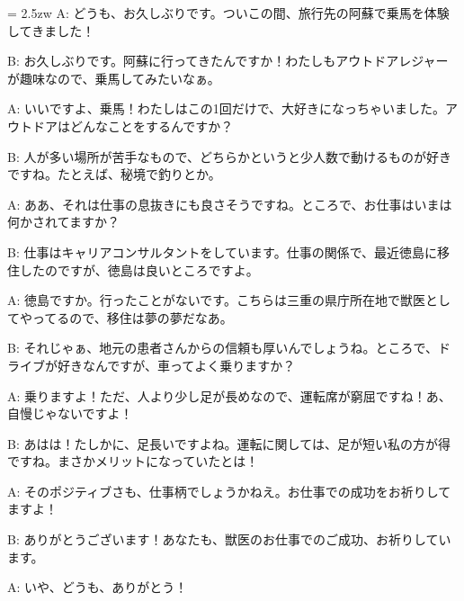 \documentclass[11pt]{amsart}
\title{}
\author{}
\newenvironment{hangall}[1]{\hangindent = 2.5zw\everypar{\hangindent = 2.5zw}}{}
\begin{document}
\maketitle
\begin{hangall}{}%
A: どうも、お久しぶりです。ついこの間、旅行先の阿蘇で乗馬を体験してきました！

B: お久しぶりです。阿蘇に行ってきたんですか！わたしもアウトドアレジャーが趣味なので、乗馬してみたいなぁ。

A: いいですよ、乗馬！わたしはこの1回だけで、大好きになっちゃいました。アウトドアはどんなことをするんですか？

B: 人が多い場所が苦手なもので、どちらかというと少人数で動けるものが好きですね。たとえば、秘境で釣りとか。

A: ああ、それは仕事の息抜きにも良さそうですね。ところで、お仕事はいまは何かされてますか？

B: 仕事はキャリアコンサルタントをしています。仕事の関係で、最近徳島に移住したのですが、徳島は良いところですよ。

A: 徳島ですか。行ったことがないです。こちらは三重の県庁所在地で獣医としてやってるので、移住は夢の夢だなあ。

B: それじゃぁ、地元の患者さんからの信頼も厚いんでしょうね。ところで、ドライブが好きなんですが、車ってよく乗りますか？

A: 乗りますよ！ただ、人より少し足が長めなので、運転席が窮屈ですね！あ、自慢じゃないですよ！

B: あはは！たしかに、足長いですよね。運転に関しては、足が短い私の方が得ですね。まさかメリットになっていたとは！

A: そのポジティブさも、仕事柄でしょうかねえ。お仕事での成功をお祈りしてますよ！

B: ありがとうございます！あなたも、獣医のお仕事でのご成功、お祈りしています。

A: いや、どうも、ありがとう！
\end{hangall}
\end{document}
